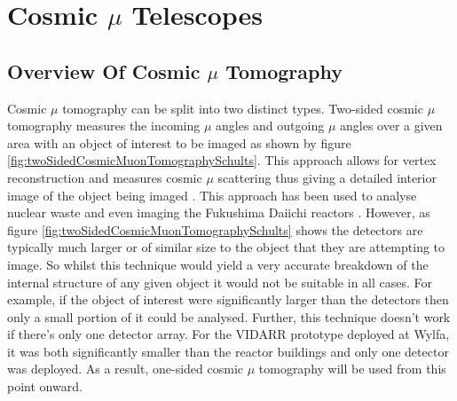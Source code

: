 
\chapter{Cosmic $\mu$ Telescopes}\label{chp:cosmicMuTelescopes}

\ifpdf
    \graphicspath{{Chapter5/Figs/Raster/}{Chapter5/Figs/PDF/}{Chapter5/Figs/}}
\else
    \graphicspath{{Chapter5/Figs/Vector/}{Chapter5/Figs/}}
\fi

\section{Overview Of Cosmic $\mu$ Tomography}\label{sec:cosMuOverview}
Cosmic $\mu$ tomography can be split into two distinct types. Two-sided cosmic $\mu$ tomography measures the incoming $\mu$ angles and outgoing $\mu$ angles over a given area with an object of interest to be imaged as shown by figure \ref{fig:twoSidedCosmicMuonTomographySchults}. This approach allows for vertex reconstruction and measures cosmic $\mu$ scattering thus giving a detailed interior image of the object being imaged \cite{schultz_2007}. This approach has been used to analyse nuclear waste \cite{jonkmans2013nuclear} and even imaging the Fukushima Daiichi reactors \cite{miyadera2013imaging}. However, as figure \ref{fig:twoSidedCosmicMuonTomographySchults} shows the  detectors are typically much larger or of similar size to the object that they are attempting to image. So whilst this technique would yield a very accurate breakdown of the internal structure of any given object it would not be suitable in all cases. For example, if the object of interest were significantly larger than the detectors then only a small portion of it could be analysed. Further, this technique doesn't work if there's only one detector array. For the VIDARR prototype deployed at Wylfa, it was both significantly smaller than the reactor buildings and only one detector was deployed. As a result, one-sided cosmic $\mu$ tomography will be used from this point onward. 

